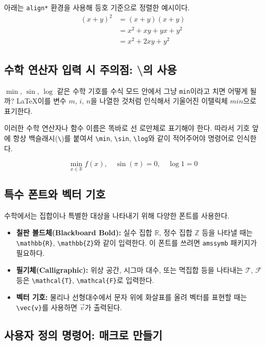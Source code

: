 \documentclass[11pt, a4paper]{article}
\newcommand{\bbr}{\mathbb{R}} %
\theoremstyle{plain}
\theoremstyle{definition}
\theoremstyle{remark}
\begin{document}
아래는 \verb|align*| 환경을 사용해 등호 기준으로 정렬한 예시이다.
\begin{align*}
    (x+y)^2 &= (x+y)(x+y) \\
            &= x^2 + xy + yx + y^2 \\
            &= x^2 + 2xy + y^2
\end{align*}

\subsection{수학 연산자 입력 시 주의점: \textbackslash 의 사용}

$\min$, $\sin$, $\log$ 같은 수학 기호를 수식 모드 안에서 그냥 \verb|min|이라고 치면 어떻게 될까?
\LaTeX\은 이를 변수 $m$, $i$, $n$을 나열한 것처럼 인식해서 기울어진 이탤릭체 $min$으로 표기한다.

이러한 수학 연산자나 함수 이름은 똑바로 선 로만체로 표기해야 한다. 따라서 기호 앞에 항상 백슬래시(\verb|\|)를 붙여서
\verb|\min|, \verb|\sin|, \verb|\log|와 같이 적어주어야 명령어로 인식한다.

\[
    \min_{x \in \bbr} f(x), \quad \sin(\pi) = 0, \quad \log 1 = 0
\]

\subsection{특수 폰트와 벡터 기호}

수학에서는 집합이나 특별한 대상을 나타내기 위해 다양한 폰트를 사용한다.
\begin{itemize}
    \item \textbf{칠판 볼드체(Blackboard Bold):}
    실수 집합 $\mathbb{R}$, 정수 집합 $\mathbb{Z}$ 등을 나타낼 때는 \verb|\mathbb{R}|, \verb|\mathbb{Z}|와 같이 입력한다. 이 폰트를 쓰려면 \verb|amssymb| 패키지가 필요하다.

    \item \textbf{필기체(Calligraphic):}
    위상 공간, 시그마 대수, 또는 멱집합 등을 나타내는 $\mathcal{T}$, $\mathcal{F}$ 등은 \verb|\mathcal{T}|, \verb|\mathcal{F}|로 입력한다.

    \item \textbf{벡터 기호:}
    물리나 선형대수에서 문자 위에 화살표를 올려 벡터를 표현할 때는 \verb|\vec{v}|를 사용하면 $\vec{v}$가 출력된다.
\end{itemize}

\subsection{사용자 정의 명령어: 매크로 만들기}
\end{document}

